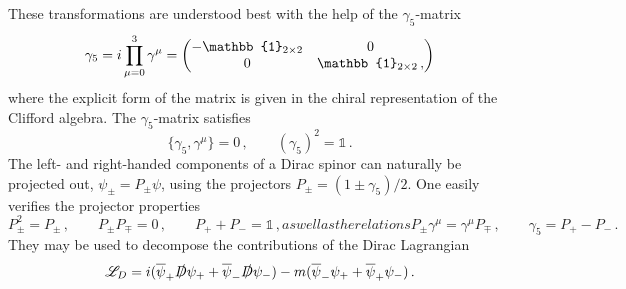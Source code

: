 These transformations are understood best with the help of the $\gamma_5$-matrix
\begin{equation}
    \gamma_5=\imagu\prod_{\mu=0}^3\gamma^\mu=\begin{pmatrix}
        -\mathbb{1}_{2\times 2}&0\\0&\mathbb{1}_{2\times 2}\,,
    \end{pmatrix}
\end{equation}
where the explicit form of the matrix is given in the chiral representation of the Clifford algebra. The $\gamma_5$-matrix satisfies
\begin{equation}
    \{\gamma_5,\gamma^\mu\}=0\,,\qquad (\gamma_5)^2=\mathbb{1}\,.
\end{equation}
The left- and right-handed components of a Dirac spinor can naturally be projected out, ${\psi_\pm=P_\pm\psi}$, using the projectors ${P_\pm=(1\pm\gamma_5)/2}$. One easily verifies the projector properties
\begin{subequations}
    \begin{equation}
        P_\pm^2=P_\pm\,,\qquad P_\pm P_\mp=0\,,\qquad P_++P_-=\mathbb{1}\,,
    \end{equation}
    as well as the relations
    \begin{equation}
        P_{\pm}\gamma^\mu=\gamma^\mu P_\mp\,,\qquad\gamma_5=P_+-P_-\,.
    \end{equation}
\end{subequations}
They may be used to decompose the contributions of the Dirac Lagrangian
\begin{equation}
    \mathscr{L}_D={i}(\overline{\psi}_+\slashed{D}\psi_++\overline{\psi}_-\slashed{D}\psi_-)-m(\overline{\psi}_-\psi_++\overline{\psi}_+\psi_-)\,.
\end{equation}

